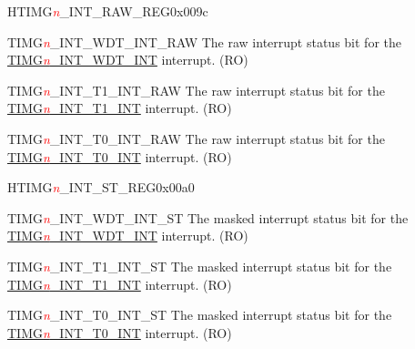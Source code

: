 \begin{register}{H}{TIMG\textcolor{red}{\it{n}}\_INT\_RAW\_REG}{0x009c}\label{regdesc:TIMERSINTRAWREG}
%
%
%
%
\regnewline%
\begin{regdesc}\begin{reglist}
\item [TIMG\textcolor{red}{\it{n}}\_INT\_WDT\_INT\_RAW]The raw interrupt status bit for the \hyperref[int:TIMERSINTWDTINT]{TIMG\textcolor{red}{\it{n}}\_INT\_WDT\_INT} interrupt. (RO)
\item [TIMG\textcolor{red}{\it{n}}\_INT\_T1\_INT\_RAW]The raw interrupt status bit for the \hyperref[int:TIMERSINTT1INT]{TIMG\textcolor{red}{\it{n}}\_INT\_T1\_INT} interrupt. (RO)
\item [TIMG\textcolor{red}{\it{n}}\_INT\_T0\_INT\_RAW]The raw interrupt status bit for the \hyperref[int:TIMERSINTT0INT]{TIMG\textcolor{red}{\it{n}}\_INT\_T0\_INT} interrupt. (RO)
\end{reglist}\end{regdesc}
\end{register}


\begin{register}{H}{TIMG\textcolor{red}{\it{n}}\_INT\_ST\_REG}{0x00a0}\label{regdesc:TIMERSINTSTREG}
%
%
%
%
\regnewline%
\begin{regdesc}\begin{reglist}
\item [TIMG\textcolor{red}{\it{n}}\_INT\_WDT\_INT\_ST]The masked interrupt status bit for the \hyperref[int:TIMERSINTWDTINT]{TIMG\textcolor{red}{\it{n}}\_INT\_WDT\_INT} interrupt. (RO)
\item [TIMG\textcolor{red}{\it{n}}\_INT\_T1\_INT\_ST]The masked interrupt status bit for the \hyperref[int:TIMERSINTT1INT]{TIMG\textcolor{red}{\it{n}}\_INT\_T1\_INT} interrupt. (RO)
\item [TIMG\textcolor{red}{\it{n}}\_INT\_T0\_INT\_ST]The masked interrupt status bit for the \hyperref[int:TIMERSINTT0INT]{TIMG\textcolor{red}{\it{n}}\_INT\_T0\_INT} interrupt. (RO)
\end{reglist}\end{regdesc}
\end{register}


